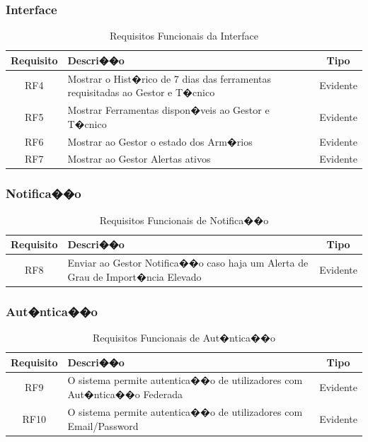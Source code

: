 \subsubsection{Interface}
\begin{table}[H]
    \centering
    \begin{tabular}{|c|p{9cm}|c|}
        \hline
        \textbf{Requisito}& \textbf{Descri��o} & \textbf{Tipo} \\
        \hline
        RF4 & Mostrar o Hist�rico de 7 dias das ferramentas requisitadas ao Gestor e T�cnico & Evidente \\
        \hline
        RF5 & Mostrar Ferramentas dispon�veis ao Gestor e T�cnico & Evidente \\
        \hline
        RF6 & Mostrar ao Gestor o estado dos Arm�rios & Evidente \\
        \hline
        RF7 & Mostrar ao Gestor Alertas ativos & Evidente \\
        \hline
    \end{tabular}
    \caption{Requisitos Funcionais da Interface}
    \label{tab:req_fun_int}
\end{table}

\subsubsection{Notifica��o}
\begin{table}[H]
    \centering
    \begin{tabular}{|c|p{9cm}|c|}
        \hline
        \textbf{Requisito} & \textbf{Descri��o} & \textbf{Tipo} \\ 
        \hline
       RF8 & Enviar ao Gestor Notifica��o caso haja um Alerta de Grau de Import�ncia Elevado & Evidente \\
        \hline
    \end{tabular}
    \caption{Requisitos Funcionais de Notifica��o}
    \label{tab:req_fun_not}
\end{table}

\subsubsection{Aut�ntica��o}
\begin{table}[H]
    \centering
    \begin{tabular}{|c|p{9cm}|c|}
        \hline
        \textbf{Requisito} & \textbf{Descri��o} & \textbf{Tipo} \\ 
        \hline
        RF9 & O sistema permite autentica��o de utilizadores com Aut�ntica��o Federada & Evidente \\
        \hline
        RF10 & O sistema permite autentica��o de utilizadores com Email/Password & Evidente \\
        \hline
    \end{tabular}
    \caption{Requisitos Funcionais de Aut�ntica��o}
    \label{tab:req_fun_aut}
\end{table}

